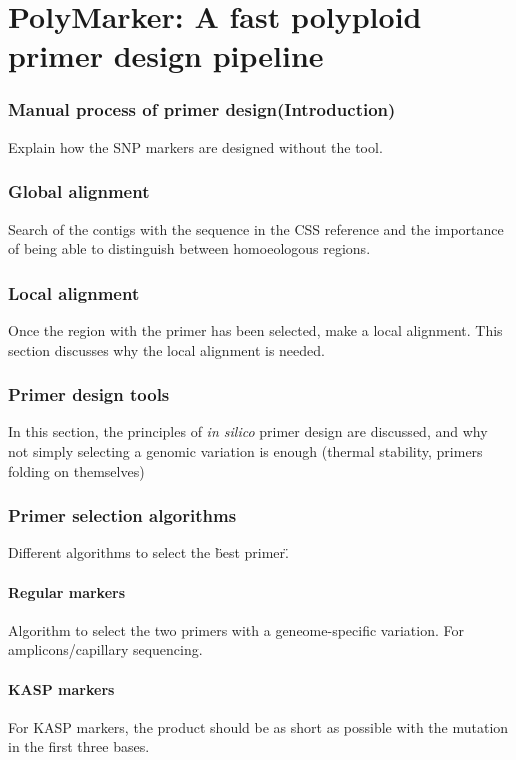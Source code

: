 
\chapter{PolyMarker: A fast polyploid primer design pipeline}


\subsection{Manual process of primer design(Introduction)} 
Explain how the SNP markers are designed without the tool. 

\subsection{Global alignment} 
Search of the contigs with the sequence in the CSS reference and the importance of being able to distinguish between homoeologous regions. 

\subsection{Local alignment} 
Once the region with the primer has been selected, make a local alignment. This section discusses why the local alignment is needed. 

\subsection{Primer design tools} 
In this section, the principles of \textit{in silico} primer design are discussed, and why not simply selecting a genomic variation is enough (thermal stability, primers folding on themselves)

\subsection{Primer selection algorithms} 
Different algorithms to select the \"best primer\". 

\subsubsection{Regular markers}  
Algorithm to select the two primers with a geneome-specific variation. For amplicons/capillary sequencing. 

\subsubsection{KASP markers} 
For KASP markers, the product should be as short as possible with the mutation in the first three bases. 

